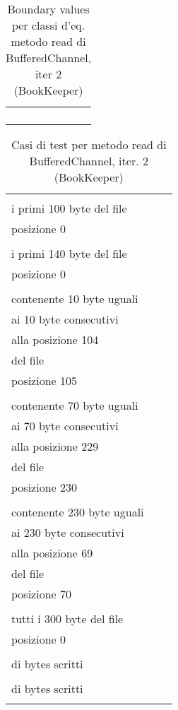 \documentclass[10pt, a4paper]{article}
\newcommand{\Intmaketable}[4]{
	\begin{longtable}{#3}
	#4
	\caption{#2}
	\label{#1}
	\end{longtable}
}
\newcommand{\Intbvtable}[3]{
	\Intmaketable{#1}{#2}{|l|l|l|}{
	\hline
	\thead{Parametro formale} & \thead{Classe d'equivalenza} & \thead{Boundary value}\\
	\hline
	\hline
	#3
	\hline}
}
\newcommand{\Inttestctable}[3]{
	\Intmaketable{#1}{#2}{|l|l|l|}{
	\hline
	\thead{Input} & \thead{Esito atteso} & \thead{Motivazione}\\
	\hline
	\hline
	#3
	\hline}
}
\newcommand{\Intbvcaption}[4]{Boundary values per classi d'eq. metodo #1 di #2, iter #3 (#4)}
\newcommand{\Inttestccaption}[4]{Casi di test per metodo #1 di #2, iter. #3 (#4)}
\newcommand{\gettablelabel}[5]{table:#1:#2:#3:iter#4:proj#5}
\newcommand{\bvtable}[5]{
	\Intbvtable{\gettablelabel{bv}{#1}{#2}{#3}{#4}}
		{\Intbvcaption{#1}{#2}{#3}{#4}}
		{#5}
}
\newcommand{\testctable}[5]{
	\Inttestctable{\gettablelabel{testc}{#1}{#2}{#3}{#4}}
		{\Inttestccaption{#1}{#2}{#3}{#4}}
		{#5}
}
\newcommand{\tcell}{\makecell[tl]}
\newcommand{\newtrow}{\\ \hline}
\def\bookkeeper{BookKeeper}
\newcommand{\ceq}[1]{\{#1\}}
\begin{document}
	\bvtable{read}{BufferedChannel}{2}{\bookkeeper}{
			\tcell{dest} & \tcell{\ceq{buffer di destinazione vuoto}} & \tcell{ByteBuf()}
		\newtrow
			\tcell{pos} & \tcell{\ceq{$\ge 0$}} & \tcell{$0$}
		\newtrow
			\tcell{length} & \tcell{\ceq{$\ge 1$}} & \tcell{1}
		\newtrow
	}
	
	\testctable{read}{BufferedChannel}{2}{\bookkeeper}{
			\tcell{ByteBuf(), 0, 100} &
			\tcell{Buffer destinazione contenente\\
					i primi 100 byte del file} &
			\tcell{Lettura di 100 byte dalla\\posizione 0}
		\newtrow
			\tcell{ByteBuf(), 0, 140} &
			\tcell{Buffer destinazione contenente\\
					i primi 140 byte del file} &
			\tcell{Lettura di 140 byte dalla\\posizione 0}
		\newtrow
			\tcell{ByteBuf(), 105, 10} & 
			\tcell{Buffer destinazione\\ 
				contenente 10 byte uguali\\ 
				ai 10 byte consecutivi\\
				alla posizione 104\\ 
				del file} &
			\tcell{Lettura di 10 byte dalla\\posizione 105}
		\newtrow
			\tcell{ByteBuf(), 230, 70} & 
			\tcell{Buffer destinazione\\ 
				contenente 70 byte uguali\\ 
				ai 70 byte consecutivi\\
				alla posizione 229\\ 
				del file} &
			\tcell{Lettura di 70 byte dalla\\posizione 230}
		\newtrow
			\tcell{ByteBuf(), 70, 230} & 
			\tcell{Buffer destinazione\\ 
				contenente 230 byte uguali\\ 
				ai 230 byte consecutivi\\
				alla posizione 69\\ 
				del file} &
			\tcell{Lettura di 230 byte dalla\\posizione 70}
		\newtrow
			\tcell{ByteBuf(), 0, 300} &
			\tcell{Buffer destinazione contenente\\
					tutti i 300 byte del file} &
			\tcell{Lettura di 300 byte dalla\\posizione 0}
		\newtrow
			\tcell{ByteBuf(), 0, 301} &
			\tcell{IOException viene lanciata} &
			\tcell{
					La lettura eccede il numero\\
					di bytes scritti}
		\newtrow
			\tcell{ByteBuf(), 300, 1} &
			\tcell{IOException viene lanciata} &
			\tcell{
					La lettura eccede il numero\\
					di bytes scritti}
		\newtrow
	}
	
\end{document}
